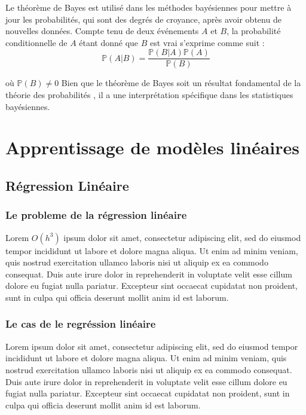 		
		
		\begin{thm} Le théorème de Bayes est utilisé dans les méthodes bayésiennes pour mettre à jour les probabilités, qui sont des degrés de croyance, après avoir obtenu de nouvelles données. Compte tenu de deux événements $A$  et $B$, la probabilité conditionnelle de $A$ étant donné que $B$ est vrai s'exprime comme suit  :
			\begin{equation}
				\mathbb{P}(A|B) = \frac{\mathbb{P}(B|A) \mathbb{P}(A)}{\mathbb{P}(B)}
			\end{equation}
			
		\end{thm}
	
		où $\mathbb{P}(B) \ne 0$ Bien que le théorème de Bayes soit un résultat fondamental de la théorie des probabilités , il a une interprétation spécifique dans les statistiques bayésiennes.
		
		
		
		
	\section{Apprentissage de modèles linéaires}
	\subsection{Régression Linéaire}
	\subsubsection{Le probleme de la régression linéaire}
		Lorem $O(h^3)$ ipsum dolor sit amet, consectetur adipiscing elit, sed do eiusmod tempor incididunt ut labore et dolore magna aliqua. Ut enim ad minim veniam, quis nostrud exercitation ullamco laboris nisi ut aliquip ex ea commodo consequat. Duis aute irure dolor in reprehenderit in voluptate velit esse cillum dolore eu fugiat nulla pariatur. Excepteur sint occaecat cupidatat non proident, sunt in culpa qui officia deserunt mollit anim id est laborum.
	\subsubsection{Le cas de le regréssion linéaire}
		Lorem ipsum dolor sit amet, consectetur adipiscing elit, sed do eiusmod tempor incididunt ut labore et dolore magna aliqua. Ut enim ad minim veniam, quis nostrud exercitation ullamco laboris nisi ut aliquip ex ea commodo consequat. Duis aute irure dolor in reprehenderit in voluptate velit esse cillum dolore eu fugiat nulla pariatur. Excepteur sint occaecat cupidatat non proident, sunt in culpa qui officia deserunt mollit anim id est laborum.
